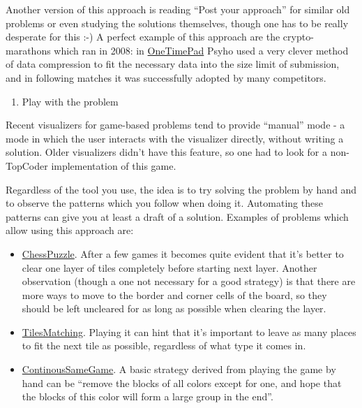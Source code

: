 Another version of this approach is reading ``Post your approach'' for
similar old problems or even studying the solutions themselves, though
one has to be really desperate for this :-) A perfect example of this
approach are the crypto-marathons which ran in 2008: in
\href{http://www.topcoder.com/longcontest/?module=ViewProblemStatement\&rd=13564\&pm=9906}{OneTimePad}
Psyho used a very clever method of data compression to fit the necessary
data into the size limit of submission, and in following matches it was
successfully adopted by many competitors.

\begin{enumerate}
\def\labelenumi{\arabic{enumi}.}
\setcounter{enumi}{1}
\tightlist
\item
  Play with the problem
\end{enumerate}

Recent visualizers for game-based problems tend to provide ``manual''
mode - a mode in which the user interacts with the visualizer directly,
without writing a solution. Older visualizers didn't have this feature,
so one had to look for a non-TopCoder implementation of this game.

Regardless of the tool you use, the idea is to try solving the problem
by hand and to observe the patterns which you follow when doing it.
Automating these patterns can give you at least a draft of a solution.
Examples of problems which allow using this approach are:

\begin{itemize}
\item
  \href{http://www.topcoder.com/longcontest/?module=ViewProblemStatement\&rd=14195\&pm=10728}{ChessPuzzle}.
  After a few games it becomes quite evident that it's better to clear
  one layer of tiles completely before starting next layer. Another
  observation (though a one not necessary for a good strategy) is that
  there are more ways to move to the border and corner cells of the
  board, so they should be left uncleared for as long as possible when
  clearing the layer.
\item
  \href{http://www.topcoder.com/longcontest/?module=ViewProblemStatement\&rd=13795\&pm=10410}{TilesMatching}.
  Playing it can hint that it's important to leave as many places to fit
  the next tile as possible, regardless of what type it comes in.
\item
  \href{http://www.topcoder.com/longcontest/?module=ViewProblemStatement\&rd=10815\&pm=7789}{ContinousSameGame}.
  A basic strategy derived from playing the game by hand can be ``remove
  the blocks of all colors except for one, and hope that the blocks of
  this color will form a large group in the end''.
\end{itemize}

